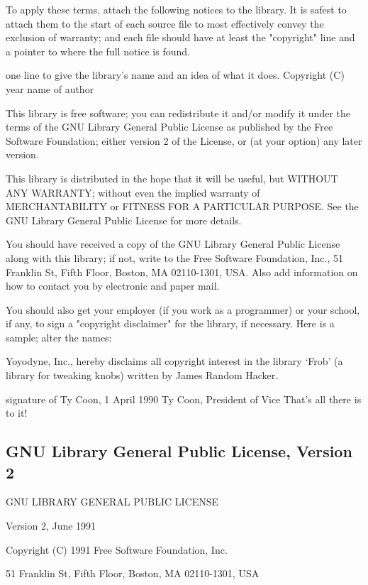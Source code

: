 To apply these terms, attach the following notices to the library. It is safest to attach them to the start of each source file to most effectively convey the exclusion of warranty; and each file should have at least the "copyright" line and a pointer to where the full notice is found. 

one line to give the library's name and an idea of what it does.
Copyright (C) year  name of author

This library is free software; you can redistribute it and/or
modify it under the terms of the GNU Library General Public
License as published by the Free Software Foundation; either
version 2 of the License, or (at your option) any later version.

This library is distributed in the hope that it will be useful,
but WITHOUT ANY WARRANTY; without even the implied warranty of
MERCHANTABILITY or FITNESS FOR A PARTICULAR PURPOSE.  See the GNU
Library General Public License for more details.

You should have received a copy of the GNU Library General Public
License along with this library; if not, write to the
Free Software Foundation, Inc., 51 Franklin St, Fifth Floor,
Boston, MA  02110-1301, USA.
Also add information on how to contact you by electronic and paper mail. 

You should also get your employer (if you work as a programmer) or your school, if any, to sign a "copyright disclaimer" for the library, if necessary. Here is a sample; alter the names: 

Yoyodyne, Inc., hereby disclaims all copyright interest in
the library `Frob' (a library for tweaking knobs) written
by James Random Hacker.

signature of Ty Coon, 1 April 1990
Ty Coon, President of Vice
That's all there is to it!






\newpage	
\subsection{GNU Library General Public License, Version 2}
\label{LGPLv2}
\begin{center}
	GNU LIBRARY GENERAL PUBLIC LICENSE
	
	Version 2, June 1991 
\end{center}


\noindent Copyright (C) 1991 Free Software Foundation, Inc.

51 Franklin St, Fifth Floor, Boston, MA  02110-1301, USA


